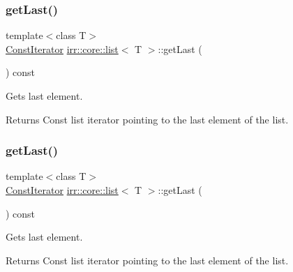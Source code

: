 \subsubsection{\texorpdfstring{get\+Last()}{getLast()}\hspace{0.1cm}{\footnotesize\ttfamily [3/4]}}
{\footnotesize\ttfamily template$<$class T$>$ \\
\hyperlink{classirr_1_1core_1_1list_1_1ConstIterator}{Const\+Iterator} \hyperlink{classirr_1_1core_1_1list}{irr\+::core\+::list}$<$ T $>$\+::get\+Last (\begin{DoxyParamCaption}{ }\end{DoxyParamCaption}) const\hspace{0.3cm}{\ttfamily [inline]}}



Gets last element. 

\begin{DoxyReturn}{Returns}
Const list iterator pointing to the last element of the list. 
\end{DoxyReturn}
\mbox{\label{classirr_1_1core_1_1list_a7b296ee9e099847dadf9a0a18df842e9}} 
\subsubsection{\texorpdfstring{get\+Last()}{getLast()}\hspace{0.1cm}{\footnotesize\ttfamily [4/4]}}
{\footnotesize\ttfamily template$<$class T$>$ \\
\hyperlink{classirr_1_1core_1_1list_1_1ConstIterator}{Const\+Iterator} \hyperlink{classirr_1_1core_1_1list}{irr\+::core\+::list}$<$ T $>$\+::get\+Last (\begin{DoxyParamCaption}{ }\end{DoxyParamCaption}) const\hspace{0.3cm}{\ttfamily [inline]}}



Gets last element. 

\begin{DoxyReturn}{Returns}
Const list iterator pointing to the last element of the list. 
\end{DoxyReturn}
\mbox{\label{classirr_1_1core_1_1list_aa4b91d7a9191fc98266425366b774c8a}} 
